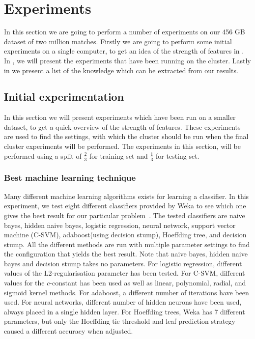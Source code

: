 \section{Experiments}\label{sec:testing}
In this section we are going to perform a number of experiments on our 456 GB dataset of two million matches. Firstly we are going to perform some initial experiments on a single computer, to get an idea of the strength of features in . In , we will present the experiments that have been running on the cluster. Lastly in  we present a list of the knowledge which can be extracted from our results.  

\subsection{Initial experimentation}\label{sec:initialtest}
In this section we will present experiments which have been run on a smaller dataset, to get a quick overview of the strength of features. 
These experiments are used to find the settings, with which the cluster should be run when the final cluster experiments will be performed. The experiments in this section, will be performed using a split of $\frac{2}{3}$ for training set and $\frac{1}{3}$ for testing set.

\subsubsection{Best machine learning technique}
Many different machine learning algorithms exists for learning a classifier. In this experiment, we test eight different classifiers provided by Weka to see which one gives the best result for our particular problem~\cite{weka}. 
The tested classifiers are naive bayes, hidden naive bayes, logistic regression, neural network, support vector machine (C-SVM), adaboost(using decision stump), Hoeffding tree, and decision stump. 
All the different methods are run with multiple parameter settings to find the configuration that yields the best result. 
Note that naive bayes, hidden naive bayes and decision stump takes no parameters. 
For logistic regression, different values of the L2-regularisation parameter has been tested. 
For C-SVM, different values for the $c$-constant has been used as well as linear, polynomial, radial, and sigmoid kernel methods. 
For adaboost, a different number of iterations have been used. For neural networks, different number of hidden neurons have been used, always placed in a single hidden layer. 
For Hoeffding trees, Weka has 7 different parameters, but only the Hoeffding tie threshold and leaf prediction strategy caused a different accuracy when adjusted.

